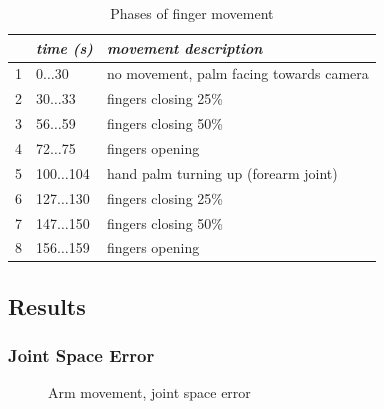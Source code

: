 \begin{table}
\centering
\begin{tabular}{|c|l|l|}
\hline
 & \emph{time (s)} & \emph{movement description} \\
\hline
1 & 0$\dots$30 & no movement, palm facing towards camera \\
\hline
2 & 30$\dots$33 & fingers closing 25\% \\
\hline
3 & 56$\dots$59 & fingers closing 50\% \\
\hline
4 & 72$\dots$75 & fingers opening \\
\hline
5 & 100$\dots$104 & hand palm turning up (forearm joint) \\
\hline
6 & 127$\dots$130 & fingers closing 25\% \\
\hline
7 & 147$\dots$150 & fingers closing 50\% \\
\hline
8 & 156$\dots$159 & fingers opening \\
\hline
\end{tabular}
\caption{Phases of finger movement}
\label{tab:vic_finger_movement_phases}
\end{table}


\subsection{Results}

\subsubsection{Joint Space Error}

\begin{figure}
\centering
{}
\caption{Arm movement, joint space error}
\end{figure}

